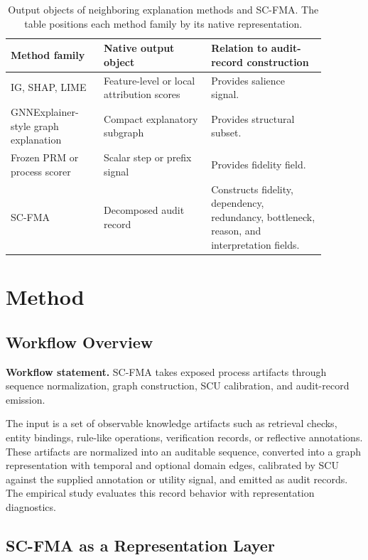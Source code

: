 \documentclass[a4paper,fleqn]{cas-sc}
\begin{document}
\begin{table}[ht]
\caption{Output objects of neighboring explanation methods and SC-FMA. The table positions each method family by its native representation.}
\label{tab:alternative-representation-comparison}
\centering
\small
\renewcommand{\arraystretch}{1.08}
\begin{tabular}{Z{0.26\linewidth}Z{0.30\linewidth}Z{0.32\linewidth}}
\toprule
\textbf{Method family} & \textbf{Native output object} & \textbf{Relation to audit-record construction} \\
\midrule
IG, SHAP, LIME & Feature-level or local attribution scores & Provides salience signal. \\
GNNExplainer-style graph explanation & Compact explanatory subgraph & Provides structural subset. \\
Frozen PRM or process scorer & Scalar step or prefix signal & Provides fidelity field. \\
SC-FMA & Decomposed audit record & Constructs fidelity, dependency, redundancy, bottleneck, reason, and interpretation fields. \\
\bottomrule
\end{tabular}
\end{table}

\section{Method}
\label{sec:methods}

\subsection{Workflow Overview}

\textbf{Workflow statement.} SC-FMA takes exposed process artifacts through sequence normalization, graph construction, SCU calibration, and audit-record emission.

The input is a set of observable knowledge artifacts such as retrieval checks, entity bindings, rule-like operations, verification records, or reflective annotations. These artifacts are normalized into an auditable sequence, converted into a graph representation with temporal and optional domain edges, calibrated by SCU against the supplied annotation or utility signal, and emitted as audit records. The empirical study evaluates this record behavior with representation diagnostics.

\subsection{SC-FMA as a Representation Layer}
\end{document}
